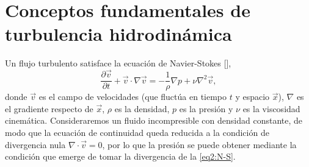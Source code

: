 








\section{Conceptos fundamentales de turbulencia hidrodi\-námica}\label{sec:FundTurbulenciaHD}
Un flujo turbulento satisface la ecuación de Navier-Stokes
[\cite{batchelor_theory_1953}],
\begin{equation}\label{eq2:N-S}
  \frac{\partial \vec{v}}{\partial t} + \vec{v}\cdot\nabla\vec{v} =
  -\frac{1}{\rho}\nabla p + \nu\nabla^2 \vec{v},
\end{equation}
donde $\vec{v}$ es el campo de velocidades (que fluctúa en tiempo $t$
y espacio $\vec{x}$), $\nabla$ es el gradiente respecto de $\vec{x}$,
$\rho$ es la densidad, $p$ es la presión y $\nu$ es la viscosidad
cinemática. Consideraremos un fluido incompresible con densidad
constante, de modo que la ecuación de continuidad queda reducida a la
condición de divergencia nula $\nabla\cdot\vec{v} = 0$, por lo que la
presión se puede obtener mediante la condición que emerge de tomar la
divergencia de la \cref{eq2:N-S}.


